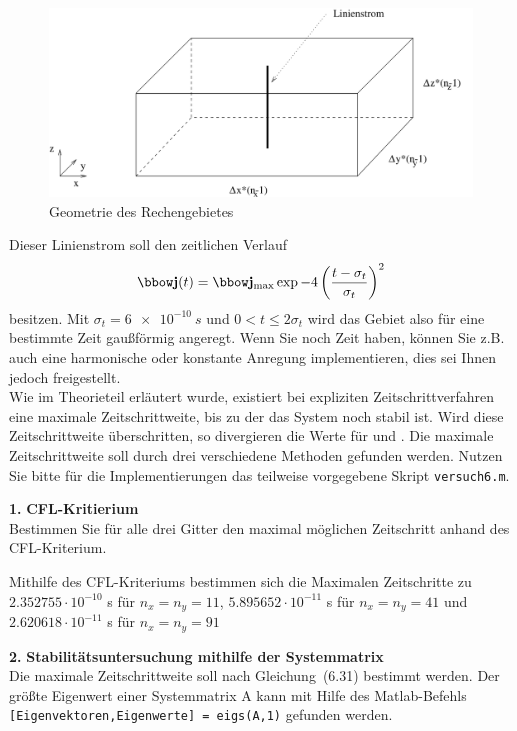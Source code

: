 \documentclass[Protokollheft.tex]{subfiles}
\begin{document}
\begin{figure}[h]
    \centering
    \includegraphics[scale=0.7]{v6_praktskizze.pdf}
    \caption{Geometrie des Rechengebietes}\label{fig:anregung}
\end{figure}

\noindent Dieser Linienstrom soll den zeitlichen Verlauf
\begin{align}
    \jfit(t) = \jfit_{\text{max}} \exp{-4\left(\frac{t-\sigma_t}{\sigma_t}\right)^2}
\end{align}
besitzen. Mit $\sigma_t=\SI{6e-10}{s}$ und $0 < t\leq 2 \sigma_t$ wird das Gebiet also für eine bestimmte Zeit gaußförmig angeregt. Wenn Sie noch Zeit haben, können Sie z.B. auch eine harmonische oder konstante Anregung implementieren, dies sei Ihnen jedoch freigestellt.\\
\noindent
Wie im Theorieteil erläutert wurde, existiert bei expliziten Zeitschrittverfahren eine maximale Zeitschrittweite, bis zu
der das System noch stabil ist. Wird diese Zeitschrittweite
überschritten, so divergieren die Werte für {\efit} und {\hfit}. Die maximale
Zeitschrittweite soll durch drei verschiedene Methoden gefunden werden. Nutzen Sie bitte für die Implementierungen das teilweise vorgegebene Skript \lstinline{versuch6.m}.

\begin{framed}
	\noindent \textbf{1.} \textbf{CFL-Kritierium}\\
Bestimmen Sie für alle drei Gitter den maximal möglichen Zeitschritt anhand des CFL-Kriterium.\label{exer:calcDeltaTmaxWithCFL}
\end{framed}

Mithilfe des CFL-Kriteriums bestimmen sich die Maximalen Zeitschritte zu $2.352755\cdot 10^{-10}$ s für $n_x = n_y = 11$, $5.895652 \cdot 10^{-11}$ s für $n_x = n_y = 41$ und $2.620618 \cdot 10^{-11}$ s für $n_x = n_y = 91$
\begin{framed}
	\noindent \textbf{2.} \textbf{Stabilitätsuntersuchung mithilfe der Systemmatrix}\\
Die maximale Zeitschrittweite soll nach Gleichung~(6.31) bestimmt werden.
Der größte Eigenwert einer Systemmatrix A kann mit Hilfe
des Matlab-Befehls\\
\lstinline{[Eigenvektoren,Eigenwerte] = eigs(A,1)} gefunden werden.\label{exer:calcDeltaTmaxWithEV}
\end{framed}
\end{document}
